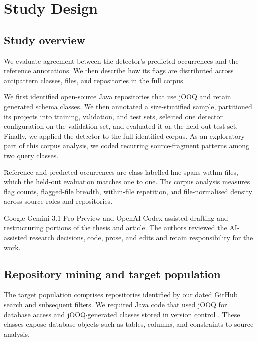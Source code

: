 \section{Study Design}\label{sec:studyDesign}

\subsection{Study overview}

We evaluate agreement between the detector's predicted occurrences and the reference annotations. We then describe how its flags are distributed across antipattern classes, files, and repositories in the full corpus.

We first identified open-source Java repositories that use jOOQ and retain generated schema classes. We then annotated a size-stratified sample, partitioned its projects into training, validation, and test sets, selected one detector configuration on the validation set, and evaluated it on the held-out test set. Finally, we applied the detector to the full identified corpus. As an exploratory part of this corpus analysis, we coded recurring source-fragment patterns among two query classes.

Reference and predicted occurrences are class-labelled line spans within files, which the held-out evaluation matches one to one. The corpus analysis measures flag counts, flagged-file breadth, within-file repetition, and file-normalised density across source roles and repositories.

Google Gemini 3.1 Pro Preview  and OpenAI Codex  assisted drafting and restructuring portions of the thesis and article. The authors reviewed the AI-assisted research decisions, code, prose, and edits and retain responsibility for the work.

\subsection{Repository mining and target population}\label{sec:mining}

The target population comprises repositories identified by our dated GitHub search and subsequent filters. We required Java code that used jOOQ for database access and jOOQ-generated classes stored in version control . These classes expose database objects such as tables, columns, and constraints to source analysis.

